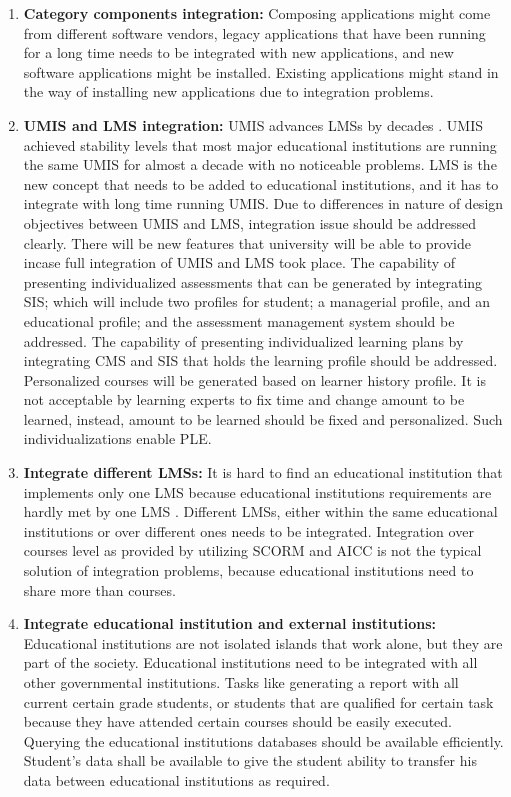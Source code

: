 \documentclass[12pt,a4paper,final,twoside,onecolumn,titlepage]{book}
\begin{document}
\begin{enumerate}
\item \textbf{Category components integration:} Composing applications might come from different software vendors, legacy applications that have been running for a long time needs to be integrated with new applications, and new software applications might be installed. Existing applications might stand in the way of installing new applications due to integration problems.
\item \textbf{\gls{UMIS} and \gls{LMS} integration:} \gls{UMIS} advances \gls{LMS}s by decades \cite{UMIS19}. \gls{UMIS} achieved stability levels that most major educational institutions are running the same \gls{UMIS} for almost a decade with no noticeable problems. \gls{LMS} is the new concept that needs to be added to educational institutions, and it has to integrate with long time running \gls{UMIS}. Due to differences in nature of design objectives between \gls{UMIS} and \gls{LMS}, integration issue should be addressed clearly. There will be new features that university will be able to provide incase full integration of \gls{UMIS} and \gls{LMS} took place. The capability of presenting individualized assessments that can be generated by integrating SIS; which will include two profiles for student; a managerial profile, and an educational profile; and the assessment management system should be addressed. 
The capability of presenting individualized learning plans by integrating \gls{CMS} and SIS that holds the learning profile should be addressed. Personalized courses will be generated based on learner history profile. It is not acceptable by learning experts to fix time and change amount to be learned, instead, amount to be learned should be fixed and personalized. Such individualizations enable PLE.
\item \textbf{Integrate different \gls{LMS}s:} It is hard to find an educational institution that implements only one \gls{LMS} because educational institutions requirements are hardly met by one \gls{LMS} \cite{UMIS07}. Different \gls{LMS}s, either within the same educational institutions or over different ones needs to be integrated. Integration over courses level as provided by utilizing SCORM and AICC is not the typical solution of integration problems, because educational institutions need to share more than courses.
\item \textbf{Integrate educational institution and external institutions:} Educational institutions are not isolated islands that work alone, but they are part of the society. Educational institutions need to be integrated with all other governmental institutions. Tasks like generating a report with all current certain grade students, or students that are qualified for certain task because they have attended certain courses should be easily executed. Querying the educational institutions databases should be available efficiently. Student’s data shall be available to give the student ability to transfer his data between educational institutions as required.
\end{enumerate}
\end{document}
